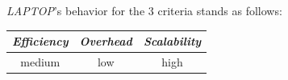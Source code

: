 %
%
%
%
\emph{LAPTOP}'s behavior for the $3$ criteria stands as follows:
\begin{center}
{\footnotesize
\begin{tabular}{ccc}
\emph{Efficiency} & \emph{Overhead} & \emph{Scalability} \\
\hline
medium &
low &
high
\end{tabular}
}
\end{center}




